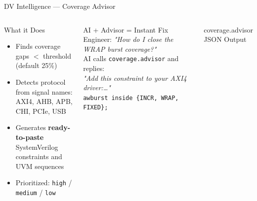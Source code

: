 \documentclass[aspectratio=169,t]{beamer}
\begin{document}
\begin{frame}[fragile]{DV Intelligence — Coverage Advisor}
  \begin{columns}[T]
      \begin{block}{What it Does}
        \begin{itemize}
          \item Finds coverage gaps $<$ threshold (default 25\%)
          \item Detects protocol from signal names:\\
                AXI4, AHB, APB, CHI, PCIe, USB
          \item Generates \textbf{ready-to-paste} SystemVerilog\\
                constraints and UVM sequences
          \item Prioritized: \texttt{high} / \texttt{medium} / \texttt{low}
        \end{itemize}
      \end{block}
      \vspace{0.3em}
      \begin{alertblock}{AI + Advisor = Instant Fix}
        \small
        Engineer: \textit{"How do I close the WRAP burst coverage?"}\\[4pt]
        AI calls \texttt{coverage.advisor} and replies:\\
        \textit{"Add this constraint to your AXI4 driver:\ldots"}\\
        \small\texttt{awburst inside \{INCR, WRAP, FIXED\};}
      \end{alertblock}

      \begin{exampleblock}{coverage.advisor JSON Output}
      \end{exampleblock}
  \end{columns}
\end{frame}

\end{document}
